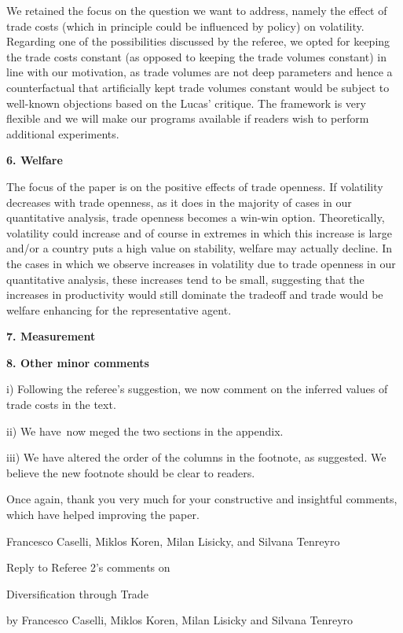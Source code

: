 \documentclass[12pt]{article}
\begin{document}
We retained the focus on the question we want to address, namely the effect
of trade costs (which in principle could be influenced by policy) on
volatility. Regarding one of the possibilities discussed by the referee, we
opted for keeping the trade costs constant (as opposed to keeping the trade
volumes constant) in line with our motivation, as trade volumes are not deep
parameters and hence a counterfactual that artificially kept trade volumes
constant would be subject to well-known objections based on the Lucas'
critique. The framework is very flexible and we will make our programs
available if readers wish to perform additional experiments.\bigskip 

\textbf{6. Welfare}

The focus of the paper is on the positive effects of trade openness. If
volatility decreases with trade openness, as it does in the majority of
cases in our quantitative analysis, trade openness becomes a win-win option.
Theoretically, volatility could increase and of course in extremes in which
this increase is large and/or a country puts a high value on stability,
welfare may actually decline. In the cases in which we observe increases in
volatility due to trade openness in our quantitative analysis, these
increases tend to be small, suggesting that the increases in productivity
would still dominate the tradeoff and trade would be welfare enhancing for
the representative agent.\bigskip

\textbf{7. Measurement}


\bigskip 

\textbf{8. Other minor comments}

i) Following the referee's suggestion, we now comment on the inferred values
of trade costs in the text.

ii) We have\ now meged the two sections in the appendix.

iii) We have altered the order of the columns in the footnote, as suggested.
We believe the new footnote should be clear to readers.\bigskip

Once again, thank you very much for your constructive and insightful
comments, which have helped improving the paper.\medskip \medskip \bigskip

Francesco Caselli, Miklos Koren, Milan Lisicky, and Silvana Tenreyro

\thispagestyle{plain}\pagebreak

\begin{center}
\thispagestyle{plain}\setcounter{page}{1}Reply to Referee 2's comments on

{\Large Diversification through Trade}

by Francesco Caselli, Miklos Koren, Milan Lisicky and Silvana
Tenreyro\medskip

\bigskip
\end{center}
\end{document}

